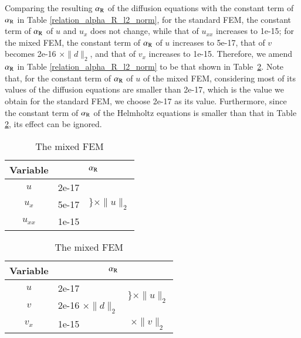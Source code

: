 \documentclass[review,3p]{elsarticle}
\begin{document}
Comparing the resulting $\alpha_{\rm R}$ of the diffusion equations with the constant term of $\alpha_{\rm R}$ in Table \ref{relation_alpha_R_l2_norm}, for the standard FEM, the constant term of $\alpha_{\rm R}$ of $u$ and $u_x$ does not change, while that of $u_{xx}$ increases to 1e-15; for the mixed FEM, the constant term of $\alpha_{\rm R}$ of $u$ increases to 5e-17, that of $v$ becomes 2e-16 $\times \|d\|_2$, and that of $v_x$ increases to 1e-15. Therefore, we amend $\alpha_{\rm R}$ in Table \ref{relation_alpha_R_l2_norm} to be that shown in Table~\ref{relation_alpha_R_l2_norm_amended}. Note that, for the constant term of $\alpha_{\rm R}$ of $u$ of the mixed FEM, considering most of its values of the diffusion equations are smaller than 2e-17, which is the value we obtain for the standard FEM, we choose 2e-17 as its value. Furthermore, since the constant term of $\alpha_{\rm R}$ of the Helmholtz equations is smaller than that in Table \ref{relation_alpha_R_l2_norm_amended}, its effect can be ignored.


\begin{table}[!ht]
\small
{}
\hspace{3.0cm}
\begin{subtable}{0.4\textwidth}
\caption{The standard FEM}
\label{relation_alpha_R_l2_norm_amended_std}
\begin{tabular}{c | l c}
\hline
Variable & \multicolumn{2}{c}{$\alpha_{\rm R}$} \\ \hline
$u$ & 2e-17 & \multirow{3}{*}{$\Bigg\}\times \|u\|_2$} \\ \cline{1-2}
$u_x$ & 5e-17 & \\ \cline{1-2}
$u_{xx}$ & 1e-15 & \\ \hline
\end{tabular}
\end{subtable}
\hspace{-2cm}
\begin{subtable}{.4\textwidth}
\caption{The mixed FEM}
\label{relation_alpha_R_l2_norm_amended_mix}
\begin{tabular}{c | l c}
\hline
Variable & \multicolumn{2}{c}{$\alpha_{\rm R}$} \\ \hline
$u$ & 2e-17 & \multirow{2}{*}{$\bigg\}\times\|u\|_2$} \\ \cline{1-2} 
$v$ & 2e-16 $\times \|d\|_2$ &  \\ \hline
$v_x$ & 1e-15 & $\times \|v\|_2$ \\ \hline
\end{tabular}
\end{subtable}
\label{relation_alpha_R_l2_norm_amended}
\end{table}
\end{document}
